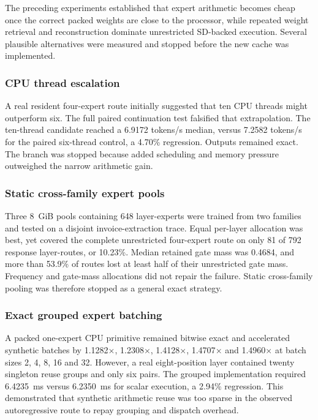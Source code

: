 The preceding experiments established that expert arithmetic becomes cheap
once the correct packed weights are close to the processor, while repeated
weight retrieval and reconstruction dominate unrestricted SD-backed execution.
Several plausible alternatives were measured and stopped before the new cache
was implemented.

\subsubsection{CPU thread escalation}

A real resident four-expert route initially suggested that ten CPU threads
might outperform six.  The full paired continuation test falsified that
extrapolation.  The ten-thread candidate reached a 6.9172 tokens/s median,
versus 7.2582 tokens/s for the paired six-thread control, a 4.70\% regression.
Outputs remained exact.  The branch was stopped because added scheduling and
memory pressure outweighed the narrow arithmetic gain.

\subsubsection{Static cross-family expert pools}

Three 8~GiB pools containing 648 layer-experts were trained from two families
and tested on a disjoint invoice-extraction trace.  Equal per-layer allocation
was best, yet covered the complete unrestricted four-expert route on only
81 of 792 response layer-routes, or 10.23\%.  Median retained gate mass was
0.4684, and more than 53.9\% of routes lost at least half of their unrestricted
gate mass.  Frequency and gate-mass allocations did not repair the failure.
Static cross-family pooling was therefore stopped as a general exact strategy.

\subsubsection{Exact grouped expert batching}

A packed one-expert CPU primitive remained bitwise exact and accelerated
synthetic batches by 1.1282$\times$, 1.2308$\times$, 1.4128$\times$,
1.4707$\times$ and 1.4960$\times$ at batch sizes 2, 4, 8, 16 and 32.
However, a real eight-position layer contained twenty singleton reuse groups
and only six pairs.  The grouped implementation required 6.4235~ms versus
6.2350~ms for scalar execution, a 2.94\% regression.  This demonstrated that
synthetic arithmetic reuse was too sparse in the observed autoregressive route
to repay grouping and dispatch overhead.

